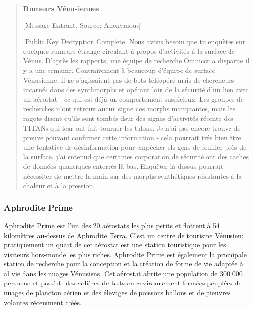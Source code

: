                                                       \begin{quotation} \textbf{Rumeurs Vénusiennes} 

                                                         [Message Entrant. Source: Anonymous] 

                                                         [Public Key Decryption Complete] Nous avons besoin que tu enquètes sur quelques rumeurs étrange circulant à propos d'activités à la surface de Vénus. D'après les rapports, une équipe de recherche Omnicor a disparue il y a une semaine. Contrairement à beaucoup d'équipe de surface Vénusienne, il ne s'agissaient pas de bots téléopéré mais de chercheurs incarnés dans des synthmorphs et opérant loin de la sécurité d'un lien avec un aérostat - ce qui est déjà un comportement suspicieux. Les groupes de recherches n'ont retrouv aucun signe des morphs manquantes, mais les ragots disent qu'ils sont tombés dsur des signes d'activités récente des TITANs qui leur ont fait tourner les talons. Je n'ai pas encore trouvé de preuve pouvant confirmer cette information - cela pourrait trés bien être une tentative de désinformation pour empêcher els gens de fouiller près de la surface. j'ai entenud que certaines corporation de sécurité ont des caches de données quantiques enterrés là-bas. Enquèter là-dessus pourrait nécessiter de mettre la main sur des morphs synthétiques résistantes à la chaleur et à la pression. \end{quotation} 

                                                         \subsubsection{Aphrodite Prime} \label{sec:aphrodite-prime} 

                                                         Aphrodite Prime est l'un des 20 aérostats les plus petits et flottent à 54 kilomètres au-dessus de Aphrodite Terra. C'est un centre de tourisme Vénusien; pratiquement un quart de cet aérostat est une station touristique pour  les visiteurs hors-monde les plus riches. Aphrodite Prime est également la pricnipale station de recherche pour la conception et la création de forme de vie adaptée à al vie dans les nuages Vénusiens. Cet aérostat abrite une population de 300 000 personne et possède des volières de tests en environnement fermées peuplées de nuages de plancton aérien et des élevages de poissons ballons et de pieuvres volantes récemment créés. 

